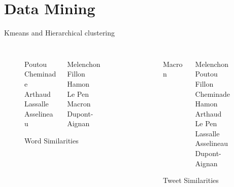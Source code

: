 \documentclass{beamer}
\begin{document}
\section{Data Mining}
\begin{frame}{Kmeans and Hierarchical clustering}
\begin{columns}
\begin{column}{.4\textwidth}
\center 
\begin{figure}
\begin{columns}
\begin{column}{.5\textwidth}
\center
Poutou\\
Cheminade\\
Arthaud\\
Lassalle\\
Asselineau\\
\end{column}


\begin{column}{.5\textwidth}
\center 
Melenchon\\
Fillon\\
Hamon\\
Le Pen\\
Macron\\
Dupont-Aignan
\end{column}
\end{columns}
\caption{Word Similarities}
\end{figure}
\end{column}


\vline

\begin{column}{.5\textwidth}
\center
\begin{figure}
\begin{columns}
\begin{column}{.5\textwidth}
\center
Macron
\end{column}

\begin{column}{.5\textwidth}
\center
Melenchon\\
Poutou\\
Fillon\\
Cheminade\\
Hamon\\
Arthaud\\
Le Pen\\
Lassalle\\
Asselineau\\
Dupont-Aignan
\end{column}
\end{columns}
\caption{Tweet Similarities}
\end{figure}
\end{column}
\end{columns}


\end{frame}
\end{document}
